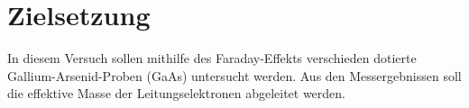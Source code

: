 \section{Zielsetzung}
\label{sec:Zielsetzung}


        In diesem Versuch sollen mithilfe des Faraday-Effekts verschieden dotierte 
        Gallium-Arsenid-Proben (GaAs) untersucht werden. Aus den Messergebnissen soll 
        die effektive Masse der Leitungselektronen abgeleitet werden.

